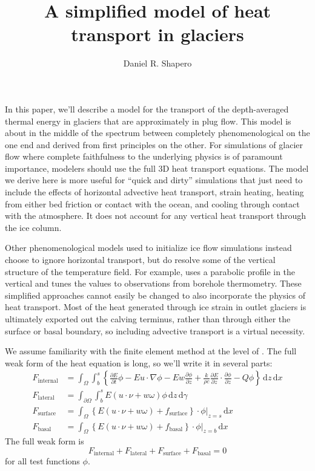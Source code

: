 \documentclass{article}
\title{A simplified model of heat transport in glaciers}
\author{Daniel R. Shapero}
\date{}
\theoremstyle{definition}
\theoremstyle{plain}
\newcommand{\ud}{\hspace{2pt}\mathrm{d}}
\begin{document}
\maketitle

In this paper, we'll describe a model for the transport of the depth-averaged thermal energy in glaciers that are approximately in plug flow.
This model is about in the middle of the spectrum between completely phenomenological on the one end and derived from first principles on the other.
For simulations of glacier flow where complete faithfulness to the underlying physics is of paramount importance, modelers should use the full 3D heat transport equations.
The model we derive here is more useful for ``quick and dirty'' simulations that just need to include the effects of horizontal advective heat transport, strain heating, heating from either bed friction or contact with the ocean, and cooling through contact with the atmosphere.
It does not account for any vertical heat transport through the ice column.

Other phenomenological models used to initialize ice flow simulations instead choose to ignore horizontal transport, but do resolve some of the vertical structure of the temperature field.
For example, \citet{humbert2005parameter} uses a parabolic profile in the vertical and tunes the values to observations from borehole thermometry.
These simplified approaches cannot easily be changed to also incorporate the physics of heat transport.
Most of the heat generated through ice strain in outlet glaciers is ultimately exported out the calving terminus, rather than through either the surface or basal boundary, so including advective transport is a virtual necessity.

We assume familiarity with the finite element method at the level of \citet{braess2007finite}.
The full weak form of the heat equation is long, so we'll write it in several parts:
\begin{align}
    F_{\text{internal}} & = \int_\Omega\int_b^s\left\{\frac{\partial E}{\partial t}\phi - E u\cdot\nabla\phi - E w\frac{\partial\phi}{\partial z} + \frac{k}{\rho c}\frac{\partial E}{\partial z}\cdot\frac{\partial\phi}{\partial z} - Q\phi\right\}\ud z\ud x \\
    F_{\text{lateral}} & = \int_{\partial\Omega}\int_b^s E(u\cdot\nu + w\omega)\phi \ud z\ud\gamma \\
    F_{\text{surface}} & = \int_\Omega\left\{E(u\cdot\nu + w\omega) + f_{\text{surface}}\right\}\cdot\phi\Big|_{z = s}\ud x \\
    F_{\text{basal}} & = \int_\Omega\left\{E(u\cdot\nu + w\omega) + f_{\text{basal}}\right\}\cdot\phi\Big|_{z = b}\ud x
\end{align}
The full weak form is
\begin{equation}
    F_{\text{internal}} + F_{\text{lateral}} + F_{\text{surface}} + F_{\text{basal}} = 0
    \label{eq:full-weak-form}
\end{equation}
for all test functions $\phi$.
\end{document}
